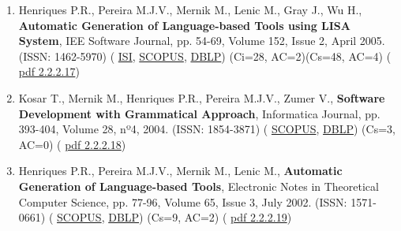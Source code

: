 \documentclass[11pt]{article}
\begin{document}
\begin{enumerate}
\item{ Henriques P.R., Pereira M.J.V., Mernik M., Lenic M., Gray J., Wu H., {
\bf{ Automatic Generation of Language-based Tools using LISA System}}, IEE Software Journal, pp. 54-69, Volume 152, Issue 2, April 2005. (ISSN: 1462-5970) (
\href{run:Publicacoes/ComprovativosISI.pdf}{ISI}, 
\href{run:Publicacoes/PublicacoesSCOPUS.pdf}{SCOPUS}, 
\href{run:Publicacoes/ComprovativosDBLP.pdf}{DBLP}) (Ci=28, AC=2)(Cs=48, AC=4) (
\href{run:Publicacoes/publicacoes/11.pdf}{pdf 2.2.2.17})}
\item{ Kosar T., Mernik M., Henriques P.R., Pereira M.J.V., Zumer V., {
\bf{ Software Development with Grammatical Approach}}, Informatica Journal, pp. 393-404, Volume 28, nº4, 2004. (ISSN: 1854-3871) (
\href{run:Publicacoes/PublicacoesSCOPUS.pdf}{SCOPUS}, 
\href{run:Publicacoes/ComprovativosDBLP.pdf}{DBLP}) (Cs=3, AC=0) (
\href{run:Publicacoes/publicacoes/10.pdf}{pdf 2.2.2.18}) }
\item{ Henriques P.R., Pereira M.J.V., Mernik M., Lenic M., {
\bf{ Automatic Generation of Language-based Tools}},  Electronic Notes in Theoretical Computer Science, pp. 77-96, Volume 65, Issue 3, July 2002. (ISSN: 1571-0661) (
\href{run:Publicacoes/PublicacoesSCOPUS.pdf}{SCOPUS}, 
\href{run:Publicacoes/ComprovativosDBLP.pdf}{DBLP}) (Cs=9, AC=2) (
\href{run:Publicacoes/publicacoes/6.pdf}{pdf 2.2.2.19}) }
\end{enumerate}
\end{document}
